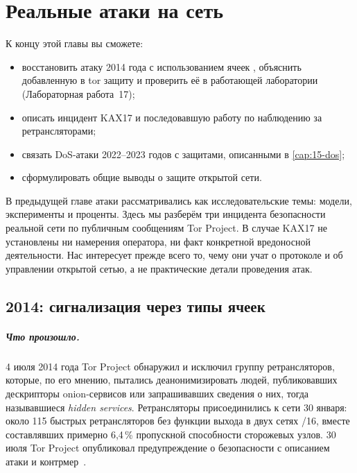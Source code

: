 \chapter{Реальные атаки на сеть}\label{cap:27-casi-rete}

\begin{obiettivi}
К концу этой главы вы сможете:
\begin{itemize}[nosep]
  \item восстановить атаку 2014 года с использованием ячеек , объяснить добавленную в tor защиту и проверить её в работающей лаборатории (Лабораторная работа~17);
  \item описать инцидент KAX17 и последовавшую работу по наблюдению за ретрансляторами;
  \item связать DoS-атаки 2022--2023 годов с защитами, описанными в \cref{cap:15-dos};
  \item сформулировать общие выводы о защите открытой сети.
\end{itemize}
\end{obiettivi}

В предыдущей главе атаки рассматривались как исследовательские темы: модели, эксперименты и проценты. Здесь мы разберём три инцидента безопасности реальной сети по публичным сообщениям Tor Project. В случае KAX17 не установлены ни намерения оператора, ни факт конкретной вредоносной деятельности. Нас интересует прежде всего то, чему они учат о протоколе и об управлении открытой сетью, а не практические детали проведения атак.

\section{2014: сигнализация через типы ячеек}\label{sec:casi-relayearly}

\paragraph{Что произошло.} 4 июля 2014 года Tor Project обнаружил и исключил группу ретрансляторов, которые, по его мнению, пытались деанонимизировать людей, публиковавших дескрипторы onion-сервисов или запрашивавших сведения о них, тогда называвшиеся \emph{hidden services}. Ретрансляторы присоединились к сети 30 января: около 115 быстрых ретрансляторов без функции выхода в двух сетях /16, вместе составлявших примерно 6,4\,\% пропускной способности сторожевых узлов. 30 июля Tor Project опубликовал предупреждение о безопасности с описанием атаки и контрмер~\cite{torblog2014relayearly}.

